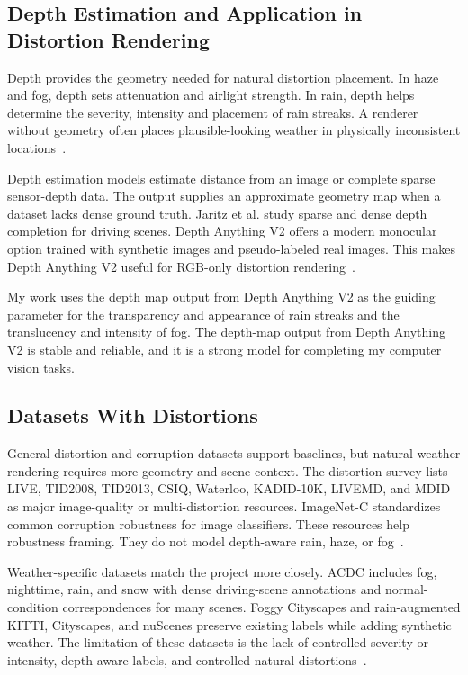 \documentclass[10pt,letterpaper]{article}
\begin{document}
\subsection{Depth Estimation and Application in Distortion Rendering}

Depth provides the geometry needed for natural distortion placement. In haze and fog, depth
sets attenuation and airlight strength. In rain, depth helps determine the severity,
intensity and placement of rain streaks. A renderer without geometry often places
plausible-looking weather in physically inconsistent
locations~\cite{sakaridisSemanticFoggyScene2018,tremblayRainRenderingEvaluating2021}.


Depth estimation models estimate distance from an image or complete sparse sensor-depth data. The
output supplies an approximate geometry map when a dataset lacks dense ground truth. Jaritz et
al. study sparse and dense depth completion for driving scenes. Depth Anything V2 offers a
modern monocular option trained with synthetic images and pseudo-labeled real images. This
makes Depth Anything V2 useful for RGB-only distortion
rendering~\cite{jaritzSparseDenseData2018,yangDepthAnythingV22024}.


My work uses the depth map output from Depth Anything V2 as the guiding parameter for
the transparency and appearance of rain streaks and the translucency and intensity of fog. The
depth-map output from Depth Anything V2 is stable and reliable, and it is a strong model for
completing my computer vision tasks.


\subsection{Datasets With Distortions}

General distortion and corruption datasets support baselines, but natural weather rendering
requires more geometry and scene context. The distortion survey lists LIVE, TID2008, TID2013,
CSIQ, Waterloo, KADID-10K, LIVEMD, and MDID as major image-quality or multi-distortion
resources. ImageNet-C standardizes common corruption robustness for image classifiers. These
resources help robustness framing. They do not model depth-aware rain, haze, or fog~\cite{muhammadaliqureshiDistortionClassificationComputer}.


Weather-specific datasets match the project more closely. ACDC includes fog, nighttime, rain,
and snow with dense driving-scene annotations and normal-condition correspondences for many
scenes. Foggy Cityscapes and rain-augmented KITTI, Cityscapes, and nuScenes preserve existing
labels while adding synthetic weather. The limitation of these datasets is the lack of
controlled severity or intensity, depth-aware labels, and controlled natural
distortions~\cite{sakaridisACDCAdverseConditions2021,sakaridisSemanticFoggyScene2018,
tremblayRainRenderingEvaluating2021}.
\end{document}
